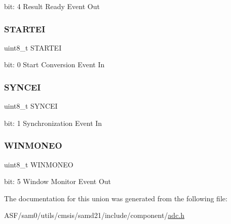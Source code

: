 bit\+: 4 Result Ready Event Out \mbox{\label{union_a_d_c___e_v_c_t_r_l___type_aa41cf9b362f9377e62cd91c88353fddc}} 
\subsubsection{\texorpdfstring{STARTEI}{STARTEI}}
{\footnotesize\ttfamily uint8\+\_\+t S\+T\+A\+R\+T\+EI}

bit\+: 0 Start Conversion Event In \mbox{\label{union_a_d_c___e_v_c_t_r_l___type_a3beaa3306c2d6865a2c8db2790422739}} 
\subsubsection{\texorpdfstring{SYNCEI}{SYNCEI}}
{\footnotesize\ttfamily uint8\+\_\+t S\+Y\+N\+C\+EI}

bit\+: 1 Synchronization Event In \mbox{\label{union_a_d_c___e_v_c_t_r_l___type_ad1d2e7703ad4ff1e345fe709a372e573}} 
\subsubsection{\texorpdfstring{WINMONEO}{WINMONEO}}
{\footnotesize\ttfamily uint8\+\_\+t W\+I\+N\+M\+O\+N\+EO}

bit\+: 5 Window Monitor Event Out 

The documentation for this union was generated from the following file\+:\begin{DoxyCompactItemize}
\item 
A\+S\+F/sam0/utils/cmsis/samd21/include/component/\mbox{\hyperlink{component_2adc_8h}{adc.\+h}}\end{DoxyCompactItemize}
